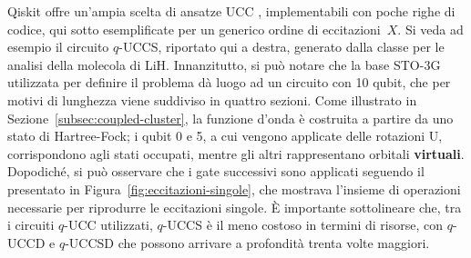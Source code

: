 \begin{minipage}{0.58\textwidth}
    Qiskit offre un'ampia scelta di ansatze UCC \cite{qiskit_UCC}, implementabili con poche righe di codice, qui sotto esemplificate per un generico ordine di eccitazioni~$X$. Si veda ad esempio il circuito $q$-UCCS, riportato qui a destra, generato dalla classe  per le analisi della molecola di LiH. Innanzitutto, si può notare che la base STO-3G utilizzata per definire il problema dà luogo ad un circuito con 10 qubit, che per motivi di lunghezza viene suddiviso in quattro sezioni. 
    Come illustrato in Sezione~\ref{subsec:coupled-cluster}, la funzione d'onda  è costruita a partire da uno stato di Hartree-Fock; i qubit 0 e 5, a cui vengono applicate delle rotazioni U, corrispondono agli stati occupati, mentre gli altri rappresentano orbitali \textbf{virtuali}. Dopodiché, si può osservare che i gate successivi sono applicati seguendo il  presentato in Figura~\ref{fig:eccitazioni-singole}, che mostrava l'insieme di operazioni necessarie per riprodurre le eccitazioni singole.
    È importante sottolineare che, tra i circuiti $q$-UCC utilizzati, $q$-UCCS è il meno costoso in termini di risorse, con $q$-UCCD e $q$-UCCSD che possono arrivare a profondità trenta volte maggiori. 
    

\end{minipage}
